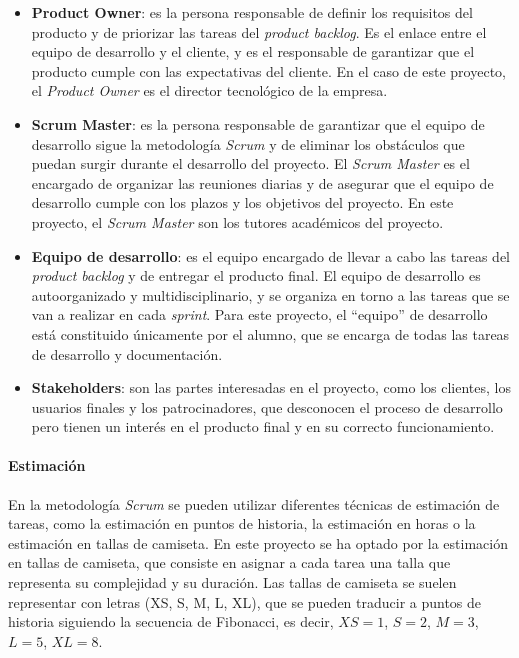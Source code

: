 \begin{itemize}
	\item \textbf{Product Owner}: es la persona responsable de definir los
		requisitos del producto y de priorizar las tareas del
		\textit{product backlog}. Es el enlace entre el equipo de desarrollo y
		el cliente, y es el responsable de garantizar que el producto cumple con
		las expectativas del cliente. En el caso de este proyecto, el
		\textit{Product Owner} es el director tecnológico de la empresa.
	\item \textbf{Scrum Master}: es la persona responsable de garantizar que el
		equipo de desarrollo sigue la metodología \textit{Scrum} y de eliminar
		los obstáculos que puedan surgir durante el desarrollo del proyecto. El
		\textit{Scrum Master} es el encargado de organizar las reuniones diarias
		y de asegurar que el equipo de desarrollo cumple con los plazos y los
		objetivos del proyecto. En este proyecto, el \textit{Scrum Master} son
		los tutores académicos del proyecto.
	\item \textbf{Equipo de desarrollo}: es el equipo encargado de llevar a cabo
		las tareas del \textit{product backlog} y de entregar el producto final.
		El equipo de desarrollo es autoorganizado y multidisciplinario, y se
		organiza en torno a las tareas que se van a realizar en cada
		\textit{sprint}. Para este proyecto, el ``equipo'' de desarrollo está
		constituido únicamente por el alumno, que se encarga de todas las tareas
		de desarrollo y documentación.
	\item \textbf{Stakeholders}: son las partes interesadas en el proyecto, como
		los clientes, los usuarios finales y los patrocinadores, que desconocen
		el proceso de desarrollo pero tienen un interés en el producto final y
		en su correcto funcionamiento.
\end{itemize}

\paragraph{Estimación}
En la metodología \textit{Scrum} se pueden utilizar diferentes técnicas de
estimación de tareas, como la estimación en puntos de historia, la estimación en
horas o la estimación en tallas de camiseta. En este proyecto se ha optado por
la estimación en tallas de camiseta, que consiste en asignar a cada tarea una
talla que representa su complejidad y su duración. Las tallas de camiseta se
suelen representar con letras (XS, S, M, L, XL), que se pueden traducir a puntos
de historia siguiendo la secuencia de Fibonacci, es decir, $XS = 1$, $S = 2$,
$M = 3$, $L = 5$, $XL = 8$.

